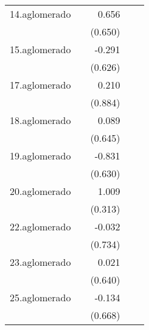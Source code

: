 {\begin{longtable}{l*{4}{D{.}{.}{-1}}}
\addlinespace
14.aglomerado&                     &       0.656         &                     &                     \\
            &                     &     (0.650)         &                     &                     \\
\addlinespace
15.aglomerado&                     &      -0.291         &                     &                     \\
            &                     &     (0.626)         &                     &                     \\
\addlinespace
17.aglomerado&                     &       0.210         &                     &                     \\
            &                     &     (0.884)         &                     &                     \\
\addlinespace
18.aglomerado&                     &       0.089         &                     &                     \\
            &                     &     (0.645)         &                     &                     \\
\addlinespace
19.aglomerado&                     &      -0.831         &                     &                     \\
            &                     &     (0.630)         &                     &                     \\
\addlinespace
20.aglomerado&                     &       1.009\sym{**} &                     &                     \\
            &                     &     (0.313)         &                     &                     \\
\addlinespace
22.aglomerado&                     &      -0.032         &                     &                     \\
            &                     &     (0.734)         &                     &                     \\
\addlinespace
23.aglomerado&                     &       0.021         &                     &                     \\
            &                     &     (0.640)         &                     &                     \\
\addlinespace
25.aglomerado&                     &      -0.134         &                     &                     \\
            &                     &     (0.668)         &                     &                     \\

\end{longtable}}
